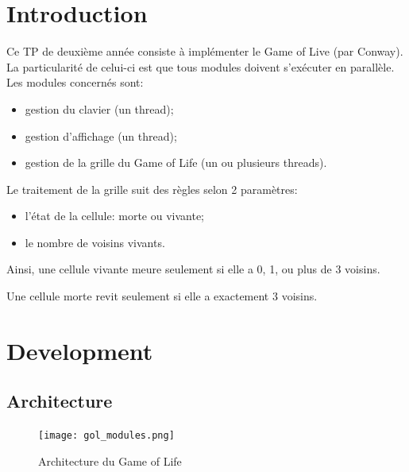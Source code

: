 \documentclass[11pt, a4paper]{article}
\begin{document}
\thispagestyle{empty}

\newpage

\section{Introduction}

Ce TP de deuxième année consiste à implémenter le Game of Live (par Conway).
La particularité de celui-ci est que tous modules doivent s'exécuter en parallèle. \\

Les modules concernés sont:

\begin{itemize}
    \item gestion du clavier (un thread);
    \item gestion d'affichage (un thread);
    \item gestion de la grille du Game of Life (un ou plusieurs threads). \\
\end{itemize}

Le traitement de la grille suit des règles selon 2 paramètres:

\begin{itemize}
    \item l'état de la cellule: morte ou vivante;
    \item le nombre de voisins vivants. \\
\end{itemize}

Ainsi, une cellule vivante meure seulement si elle a 0, 1, ou plus de 3 voisins.

Une cellule morte revit seulement si elle a exactement 3 voisins.

\newpage

\section{Development}
\subsection{Architecture}

\begin{figure}[H]
    \begin{center}
        \texttt{[image: gol\_modules.png]}
    \end{center}
    \caption{Architecture du Game of Life}
    \label{Architecture du Game of Life}
\end{figure}
\end{document}

